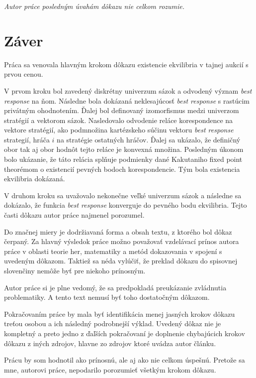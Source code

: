 \documentclass[a4paper, 11pt]{article}
\begin{document}
\textit{Autor práce posledným úvahám dôkazu nie celkom rozumie.}

\section{Záver}
Práca sa venovala hlavným krokom dôkazu existencie ekvilibria v tajnej aukcií s prvou cenou.

V prvom kroku bol zavedený diskrétny univerzum sázok a odvodený význam \textit{best response} na ňom. Následne bola dokázaná neklesajúcosť \textit{best response} s rastúcim privátným ohodnotením. Ďalej bol definovaný izomorfismus medzi univerzom stratégií a vektorom sázok. Nasledovalo odvodenie reláce korespondence na vektore stratégií, ako podmnožina kartézskeho súčinu vektoru \textit{best response} strategií, hráča $i$ na stratégie ostatných hráčov. Ďalej sa ukázalo, že definičný obor tak aj obor hodnôt tejto reláce je konvexná množina. Posledným úkonom bolo ukázanie, že táto relácia splňuje podmienky dané Kakutaniho fixed point theorémom o existencií pevných bodoch korespondencie. Tým bola existencia ekvilibria dokázaná.

V druhom kroku sa uvažovalo nekonečne veľké univerzum sázok a následne sa dokázalo, že funkcia \textit{best response} konverguje do pevného bodu ekvilibria. Tejto časti dôkazu autor  práce najmenel porozumel.

Do značnej miery je dodržiavaná forma a obsah textu, z ktorého bol dôkaz čerpaný. Za hlavný výsledok práce možno považovať vzdelávací prínos autora práce v oblasti teorie her, matematiky a metód dokazovania v spojení s uvedeným dôkazom. Taktiež sa néda vylúčiť, že preklad dôkazu do spisovnej slovenčiny nemôže byť pre niekoho prínosným.
 
Autor práce si je plne vedomý, že sa predpokladá preukázanie zvládnutia problematiky. A tento text nemusí byť toho dostatočným dôkazom.

Pokračovaním práce by mala byť identifikácia menej jasných krokov dôkazu treťou osobou a ich následný podrobnejší výklad. Uvedený dôkaz nie je kompletný a preto jedno z ďaľších pokračovaní je doplnenie chybajúcich krokov dôkazu z iných zdrojov, hlavne zo zdrojov ktoré uvádza autor článku.

Prácu by som hodnotil ako prínosnú, ale aj ako nie celkom úspešnú. Pretože sa mne, autorovi práce, nepodarilo porozumieť všetkým krokom dôkazu.
\newpage{}

\begin{flushleft}
\end{flushleft}
\end{document}
